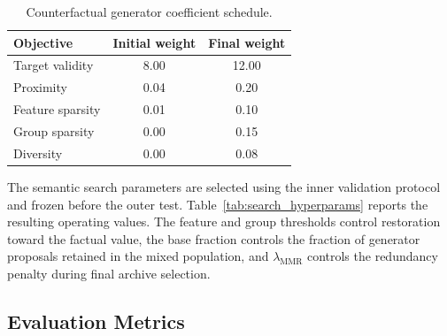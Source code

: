 \documentclass[preprint,12pt]{elsarticle}
\begin{document}
\begin{table}[!ht]
\centering
\caption{Counterfactual generator coefficient schedule.}
\label{tab:generator_loss_ramp}
\begin{tabular}{lcc}
\toprule
\textbf{Objective} & \textbf{Initial weight} & \textbf{Final weight} \\
\midrule
Target validity     & 8.00 & 12.00 \\
Proximity           & 0.04 & 0.20 \\
Feature sparsity    & 0.01 & 0.10 \\
Group sparsity      & 0.00 & 0.15 \\
Diversity           & 0.00 & 0.08 \\
\bottomrule
\end{tabular}
\end{table}

The semantic search parameters are selected using the inner validation
protocol and frozen before the outer test. Table~\ref{tab:search_hyperparams}
reports the resulting operating values. The feature and group thresholds
control restoration toward the factual value, the base fraction controls the
fraction of generator proposals retained in the mixed population, and
$\lambda_{\mathrm{MMR}}$ controls the redundancy penalty during final archive
selection.

\begin{table}[!ht]
\centering
\caption{Frozen semantic-search hyperparameters selected before outer evaluation.}
\label{tab:search_hyperparams}
\end{table}

\subsection{Evaluation Metrics}
\label{subsec:evaluation_metrics}
\end{document}
